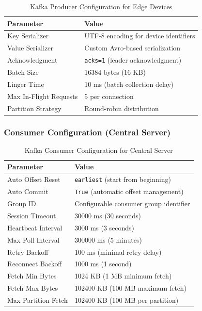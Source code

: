 \begin{table}[htbp]
\centering
\caption{Kafka Producer Configuration for Edge Devices}
\label{tab:producer_config}
\begin{tabular}{|p{4cm}|p{8cm}|}
\hline
\textbf{Parameter} & \textbf{Value} \\
\hline

Key Serializer & UTF-8 encoding for device identifiers \\
Value Serializer & Custom Avro-based serialization \\
Acknowledgment & \texttt{acks=1} (leader acknowledgment) \\
Batch Size & 16384 bytes (16 KB) \\
Linger Time & 10 ms (batch collection delay) \\
Max In-Flight Requests & 5 per connection \\
Partition Strategy & Round-robin distribution \\
\hline
\end{tabular}
\end{table}

\newpage

\subsubsection{Consumer Configuration (Central Server)}

\begin{table}[!htbp]
\centering
\caption{Kafka Consumer Configuration for Central Server}
\label{tab:consumer_config}
\begin{tabular}{|p{4cm}|p{8cm}|}
\hline
\textbf{Parameter} & \textbf{Value} \\
\hline
Auto Offset Reset & \texttt{earliest} (start from beginning) \\
Auto Commit & \texttt{True} (automatic offset management) \\
Group ID & Configurable consumer group identifier \\
Session Timeout & 30000 ms (30 seconds) \\
Heartbeat Interval & 3000 ms (3 seconds) \\
Max Poll Interval & 300000 ms (5 minutes) \\
Retry Backoff & 100 ms (minimal retry delay) \\
Reconnect Backoff & 1000 ms (1 second) \\
Fetch Min Bytes & 1024 KB (1 MB minimum fetch) \\
Fetch Max Bytes & 102400 KB (100 MB maximum fetch) \\
Max Partition Fetch & 102400 KB (100 MB per partition) \\
\hline
\end{tabular}
\end{table}